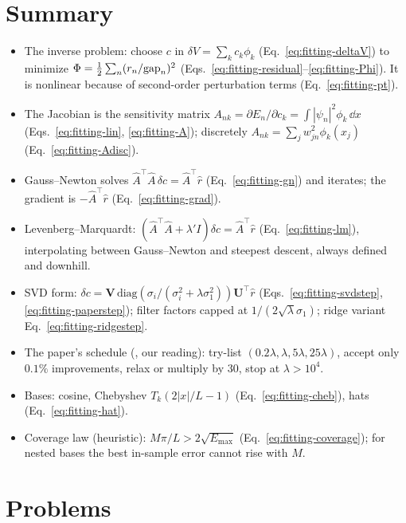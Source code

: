 \section{Summary}

\begin{itemize}
\item The inverse problem: choose $c$ in $\delta V=\sum_kc_k\phi_k$ (Eq.~\eqref{eq:fitting-deltaV}) to minimize $\Phi=\tfrac12\sum_n(r_n/\mathrm{gap}_n)^2$ (Eqs.~\eqref{eq:fitting-residual}--\eqref{eq:fitting-Phi}). It is nonlinear because of second-order perturbation terms (Eq.~\eqref{eq:fitting-pt}).
\item The Jacobian is the sensitivity matrix $A_{nk}=\partial E_n/\partial c_k=\int|\psi_n|^2\phi_k\,\dd x$ (Eqs.~\eqref{eq:fitting-lin}, \eqref{eq:fitting-A}); discretely $A_{nk}=\sum_jw_{jn}^2\phi_k(x_j)$ (Eq.~\eqref{eq:fitting-Adisc}).
\item Gauss--Newton solves $\hat A^\top\hat A\,\delta c=\hat A^\top\hat r$ (Eq.~\eqref{eq:fitting-gn}) and iterates; the gradient is $-\hat A^\top\hat r$ (Eq.~\eqref{eq:fitting-grad}).
\item Levenberg--Marquardt: $(\hat A^\top\hat A+\lambda'I)\delta c=\hat A^\top\hat r$ (Eq.~\eqref{eq:fitting-lm}), interpolating between Gauss--Newton and steepest descent, always defined and downhill.
\item SVD form: $\delta c=\bm V\,\mathrm{diag}(\sigma_i/(\sigma_i^2+\lambda\sigma_1^2))\bm U^\top\hat r$ (Eqs.~\eqref{eq:fitting-svdstep}, \eqref{eq:fitting-paperstep}); filter factors capped at $1/(2\sqrt\lambda\sigma_1)$; ridge variant Eq.~\eqref{eq:fitting-ridgestep}.
\item The paper's schedule (, our reading): try-list $(0.2\lambda,\lambda,5\lambda,25\lambda)$, accept only $0.1\%$ improvements, relax or multiply by 30, stop at $\lambda>10^4$.
\item Bases: cosine, Chebyshev $T_k(2|x|/L-1)$ (Eq.~\eqref{eq:fitting-cheb}), hats (Eq.~\eqref{eq:fitting-hat}).
\item Coverage law (heuristic): $M\pi/L>2\sqrt{E_{\max}}$ (Eq.~\eqref{eq:fitting-coverage}); for nested bases the best in-sample error cannot rise with $M$.
\end{itemize}

\section{Problems}


